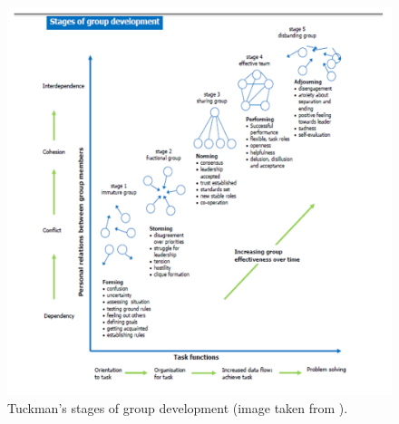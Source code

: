 \documentclass[12pt]{notes}
\begin{document}
\begin{figure}
\includegraphics[width=\textwidth]{figures/moduleD/group_stages.png}
\caption{Tuckman's stages of group development (image taken from \cite{cullen2015}).}
\label{fig:group_stage}
\end{figure}







\end{document}
